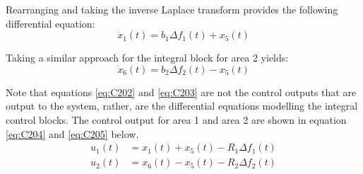 Rearranging and taking the inverse Laplace transform provides the following differential equation:
\begin{equation}
	\dot{x}_1(t) = b_1 \Delta f_1(t) + x_5(t) \label{eq:C202}
\end{equation}

Taking a similar approach for the integral block for area 2 yields:
\begin{equation}
	\dot{x}_6(t) = b_2 \Delta f_2(t) - x_5(t) \label{eq:C203}
\end{equation}

Note that equations \ref{eq:C202} and \ref{eq:C203} are not the control outputs that are output to the system, rather, are the differential equations modelling the integral control blocks. The control output for area 1 and area 2 are shown in equation \ref{eq:C204} and \ref{eq:C205} below.
\begin{align}
	u_1(t) &= x_1(t) + x_5(t) - R_1 \Delta f_1(t) \label{eq:C204} \\
	u_2(t) &= x_6(t) - x_5(t) - R_2 \Delta f_2(t) \label{eq:C205}
\end{align}